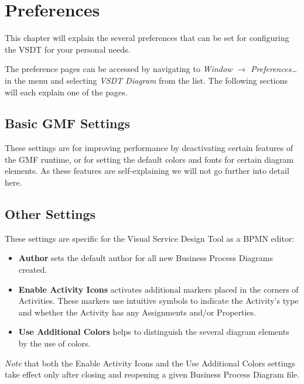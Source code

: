 \chapter{Preferences}
\label{sec:user_preferences}

This chapter will explain the several preferences that can be set for configuring the VSDT for your personal needs.

The preference pages can be accessed by navigating to \emph{Window $\rightarrow$ Preferences\dots} in the menu and selecting \emph{VSDT Diagram} from the list. The following sections will each explain one of the pages.


\section{Basic GMF Settings}
\label{sec:user_preferences_gmf}

These settings are for improving performance by deactivating certain features of the GMF runtime, or for setting the default colors and fonts for certain diagram elements.  As these features are self-explaining we will not go further into detail here.


\section{Other Settings}
\label{sec:user_preferences_other}

These settings are specific for the Visual Service Design Tool as a BPMN editor:

\begin{itemize}
	\item \textbf{Author} sets the default author for all new Business Process Diagrams created.
	\item \textbf{Enable Activity Icons} activates additional markers placed in the corners of Activities. These markers use intuitive symbols to indicate the Activity's type and whether the Activity has any Assignments and/or Properties.
	\item \textbf{Use Additional Colors} helps to distinguish the several diagram elements by the use of colors.
\end{itemize}

\emph{Note} that both the Enable Activity Icons and the Use Additional Colors settings take effect only after closing and reopening a given Business Process Diagram file.

